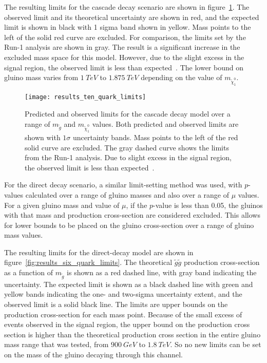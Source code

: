 The resulting limits for the cascade decay scenario are shown in figure~\ref{fig:results_ten_quark_limits}.
The observed limit and its theoretical uncertainty are shown in red, and the expected limit is shown in black with 1 sigma band shown in yellow.
Mass points to the left of the solid red curve are excluded.
For comparison, the limits set by the Run-1 analysis are shown in gray.
The result is a significant increase in the excluded mass space for this model.
However, due to the slight excess in the signal region, the observed limit is less than expected~\cite{paper-plb}.
The lower bound on gluino mass varies from $1~TeV$ to $1.875~TeV$ depending on the value of $m_{\tilde{\chi}_1^0}$.

\begin{figure}[!ht]
    \centering
    \texttt{[image: results\_ten\_quark\_limits]}
    \caption{Predicted and observed limits for the cascade decay model over a range of $m_{\tilde{g}}$ and $m_{\tilde{\chi}_1^0}$ values.
    Both predicted and observed limits are shown with $1\sigma$ uncertainty bands.
    Mass points to the left of the red solid curve are excluded.
    The gray dashed curve shows the limits from the Run-1 analysis.
    Due to slight excess in the signal region, the observed limit is less than expected~\cite{paper-plb}.}
\label{fig:results_ten_quark_limits}
\end{figure}

For the direct decay scenario, a similar limit-setting method was used, with $p$-values calculated over a range of gluino masses and also over a range of $\mu$ values.
For a given gluino mass and value of $\mu$, if the $p$-value is less than 0.05, the gluinos with that mass and production cross-section are considered excluded.
This allows for lower bounds to be placed on the gluino cross-section over a range of gluino mass values.

The resulting limits for the direct-decay model are shown in figure~\ref{fig:results_six_quark_limits}.
The theoretical $\tilde{g}\tilde{g}$ production cross-section as a function of $m_{\tilde{g}}$ is shown as a red dashed line, with gray band indicating the uncertainty.
The expected limit is shown as a black dashed line with green and yellow bands indicating the one- and two-sigma uncertainty extent, and the observed limit is a solid black line.
The limits are upper bounds on the production cross-section for each mass point.
Because of the small excess of events observed in the signal region, the upper bound on the production cross section is higher than the theoretical production cross section in the entire gluino mass range that was tested, from $900~GeV$ to $1.8~TeV$.
So no new limits can be set on the mass of the gluino decaying through this channel.

